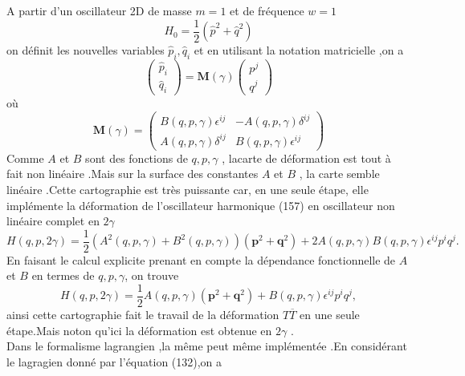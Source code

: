 \documentclass[12pt,a4paper, openany]{article}
\begin{document}
		  A partir d'un oscillateur 2D de masse $m=1$ et de fréquence $w=1$
		  \begin{equation}
		  	H_0=\frac{1}{2}\left(\hat{p}^2+\hat{q}^2\right)
		  \end{equation}
		  on définit les nouvelles variables $\hat{p}_i ,\hat{q}_i $ et en utilisant la notation matricielle ,on a 
		  \begin{equation}
		  	\begin{pmatrix}
		  	\hat{p}_i\\
		  	\hat{q}_i	
		  	\end{pmatrix}
		  	=
		  	\textbf{M}(\gamma)
		  	\begin{pmatrix}
		  		p^j\\
		  		q^j	
		  	\end{pmatrix}
		  	 \end{equation}
		  	 où
		   \begin{equation}
		   	\textbf{M}(\gamma)=
		  	\begin{pmatrix}
		  		B(q,p,\gamma)\epsilon^{ij} & -A(q,p,\gamma)\delta^{ij}\\
		  		A(q,p,\gamma)\delta^{ij} & B(q,p,\gamma)\epsilon^{ij}
		  	\end{pmatrix}
		  \end{equation}
		  Comme $A$ et $B$ sont des fonctions de $ q,p,\gamma$ , lacarte de déformation est tout à fait non linéaire .Mais sur la surface des constantes $A$ et $B$ , la carte semble linéaire .Cette cartographie est très puissante car, en une seule étape, elle implémente la déformation de l'oscillateur harmonique (157) en oscillateur non linéaire complet en $2\gamma$
		  \begin{equation}
		  	H(q,p,2\gamma)=\frac{1}{2}\left(A^2(q,p,\gamma)+B^2(q,p,\gamma)\right)\left(\textbf{p}^2+\textbf{q}^2\right)+2A(q,p,\gamma)B(q,p,\gamma)\epsilon^{ij}p^iq^j.
		  \end{equation} 
		  En faisant le calcul explicite prenant en compte la dépendance fonctionnelle de $A$ et $B$ en termes de $q, p,\gamma$, on trouve
		  \begin{equation}
		  H(q,p,2\gamma)=\frac{1}{2}A(q,p,\gamma)\left(\textbf{p}^2+\textbf{q}^2\right)+B(q,p,\gamma)\epsilon^{ij}p^iq^j,	
		  \end{equation} 
		  ainsi cette cartographie fait le travail de la déformation $T\overline{T}$
		  en une seule étape.Mais noton qu'ici la déformation est obtenue en $
		  2\gamma$ .\\
		  Dans le formalisme lagrangien ,la m\^{e}me peut m\^{e}me implémentée .En considérant le lagragien donné par l'équation (132),on a
\end{document}
